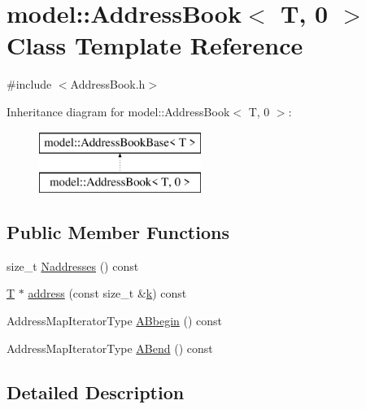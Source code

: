 \hypertarget{classmodel_1_1_address_book_3_01_t_00_010_01_4}{}\section{model\+:\+:Address\+Book$<$ T, 0 $>$ Class Template Reference}
\label{classmodel_1_1_address_book_3_01_t_00_010_01_4}


{\ttfamily \#include $<$Address\+Book.\+h$>$}

Inheritance diagram for model\+:\+:Address\+Book$<$ T, 0 $>$\+:\begin{figure}[H]
\begin{center}
\leavevmode
\includegraphics[height=2.000000cm]{classmodel_1_1_address_book_3_01_t_00_010_01_4}
\end{center}
\end{figure}
\subsection*{Public Member Functions}
\begin{DoxyCompactItemize}
\item 
size\+\_\+t \hyperlink{classmodel_1_1_address_book_3_01_t_00_010_01_4_ad2ad053d29723bd87922a36888e49c40}{Naddresses} () const 
\item 
\hyperlink{_spline_node_base__corder1_8h_a82692d3a5502b91460591f1d5504314a}{T} $\ast$ \hyperlink{classmodel_1_1_address_book_3_01_t_00_010_01_4_a70295a66bd664f98721590f041ff3ccd}{address} (const size\+\_\+t \&\hyperlink{_f_e_m_2linear__elasticity__3d_2tetgen_2generate_p_o_l_ycube_8m_a5d2aad4440da75aa43f2643e72b1a3bd}{k}) const 
\item 
Address\+Map\+Iterator\+Type \hyperlink{classmodel_1_1_address_book_3_01_t_00_010_01_4_a249334a7e1fccd293e6a10a70bf5b110}{A\+Bbegin} () const 
\item 
Address\+Map\+Iterator\+Type \hyperlink{classmodel_1_1_address_book_3_01_t_00_010_01_4_a6ff912a429b6358c1e4cd69be49b6bd2}{A\+Bend} () const 
\end{DoxyCompactItemize}


\subsection{Detailed Description}

